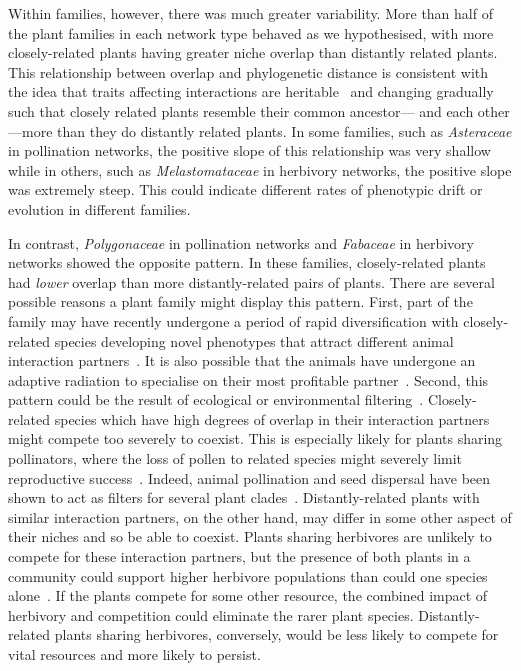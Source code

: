 \documentclass[12pt]{article}
\begin{document}
\begin{spacing}{1.5}
  Within families, however, there was much greater variability. 
  More than half of the plant families in each network type
  behaved as we hypothesised, with more 
  closely-related plants having greater niche overlap than 
  distantly related plants. This relationship between overlap and 
  phylogenetic distance is consistent with the idea that traits affecting 
  interactions are heritable~\citep{Schemske1999} and changing gradually
  such that closely related plants resemble their common ancestor--- and
  each other ---more than they do distantly related plants. In some families, 
  such as \emph{Asteraceae} in pollination networks, the positive slope of 
  this relationship was very shallow while in others, such as 
  \emph{Melastomataceae} in herbivory networks, the positive slope was 
  extremely steep. This could indicate different rates of phenotypic drift 
  or evolution in different families.


  In contrast, \emph{Polygonaceae} in pollination networks and 
  \emph{Fabaceae} in herbivory networks showed the opposite 
  pattern. In these families, closely-related plants had 
  \emph{lower} overlap than more distantly-related pairs of plants. 
  There are several possible reasons a plant family might
  display this pattern. First, part of the family may have recently 
  undergone a period of rapid diversification with closely-related species 
  developing novel phenotypes that attract different animal 
  interaction partners~\citep{Linder2008,Breitkopf2015}. It is also possible that the
  animals have undergone an adaptive radiation to 
  specialise on their most profitable partner~\citep{Janz2006}. Second, this pattern 
  could be the result of ecological or environmental filtering~\citep{Mayfield2009,Ackerly2010}. 
  Closely-related species which have high degrees of overlap in their interaction 
  partners might compete too severely to coexist. This is especially likely
  for plants sharing pollinators, where the loss of pollen to related species 
  might severely limit reproductive success~\citep{Levin1970,Bell2005,Mitchell2009}.
  Indeed, animal pollination and seed dispersal have been shown to act
  as filters for several plant clades~\citep{Mayfield2009}.
  Distantly-related plants with similar interaction partners,
  on the other hand, may differ in some other aspect of their niches
  and so be able to coexist. Plants sharing herbivores are unlikely to
  compete for these interaction partners, but the presence of both
  plants in a community could support higher herbivore populations
  than could one species alone~\citep{Russell2007}. If the plants 
  compete for some other resource, the combined impact of herbivory
  and competition could eliminate the rarer plant species. Distantly-related
  plants sharing herbivores, conversely, would be less likely to compete
  for vital resources and more likely to persist.



\end{spacing}
\end{document}
